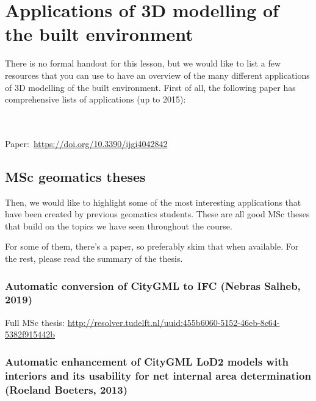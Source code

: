 
\setchapterpreamble[u]{\margintoc}

\graphicspath{{apps/}}
\renewcommand*{\thelesson}{7.1}

\chapter{Applications of 3D modelling of the built environment}%
\label{chap:apps}

There is no formal handout for this lesson, but we would like to list a few resources that you can use to have an overview of the many different applications of 3D modelling of the built environment.
First of all, the following paper has comprehensive lists of applications (up to 2015):

\begin{kaobox}[frametitle=\faExternalLink\ To read or to watch.]
\\ \\
Paper:\ \url{https://doi.org/10.3390/ijgi4042842}
\end{kaobox}

\section{MSc geomatics theses}

Then, we would like to highlight some of the most interesting applications that have been created by previous geomatics students.
These are all good MSc theses that build on the topics we have seen throughout the course.

For some of them, there's a paper, so preferably skim that when available.
For the rest, please read the summary of the thesis.

\subsection{Automatic conversion of CityGML to IFC (Nebras Salheb, 2019)}

\begin{kaobox}[frametitle=\faExternalLink\ To read or to watch.]
Full MSc thesis: \url{http://resolver.tudelft.nl/uuid:455b6060-5152-46eb-8c64-5382f915442b}
\end{kaobox}

\subsection{Automatic enhancement of CityGML LoD2 models with interiors and its usability for net internal area determination (Roeland Boeters, 2013)}

